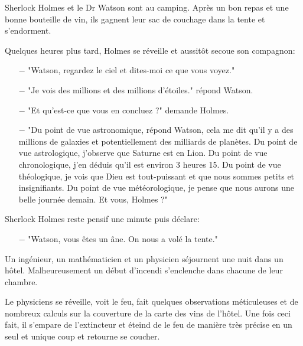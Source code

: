 	\begin{center}\underline{\hspace{5 cm}}\end{center}

Sherlock Holmes et le Dr Watson sont au camping. Après un bon repas et une bonne bouteille de vin, ils gagnent leur sac de couchage dans la tente et s'endorment.

Quelques heures plus tard, Holmes se réveille et aussitôt secoue son compagnon:

\begin{itemize}
	\item[$-$] "Watson, regardez le ciel et dites-moi ce que vous voyez."
	
	\item[$-$] "Je vois des millions et des millions d'étoiles." répond Watson.
	
	\item[$-$] "Et qu'est-ce que vous en concluez ?" demande Holmes.
	
	\item[$-$] "Du point de vue astronomique, répond Watson, cela me dit qu'il y a des millions de galaxies et potentiellement des milliards de planètes. Du point de vue astrologique, j'observe que Saturne est en Lion. Du point de vue chronologique, j'en déduis qu'il est environ 3 heures 15. Du point de vue théologique, je vois que Dieu est tout-puissant et que nous sommes petits et insignifiants. Du point de vue météorologique, je pense que nous aurons une belle journée demain. Et vous, Holmes ?"
\end{itemize}

Sherlock Holmes reste pensif une minute puis déclare:

\begin{itemize}
	\item[$-$] "Watson, vous êtes un âne. On nous a volé la tente."
\end{itemize}

	\begin{center}\underline{\hspace{5 cm}}\end{center}

Un ingénieur, un mathématicien et un physicien séjournent une nuit dans un hôtel. Malheureusement un début d'incendi s'enclenche dans chacune de leur chambre.

Le physiciens se réveille, voit le feu, fait quelques observations méticuleuses et de nombreux calculs sur la couverture de la carte des vins de l'hôtel. Une fois ceci fait, il s'empare de l'extincteur et éteind de le feu de manière très précise en un seul et unique coup et retourne se coucher.


